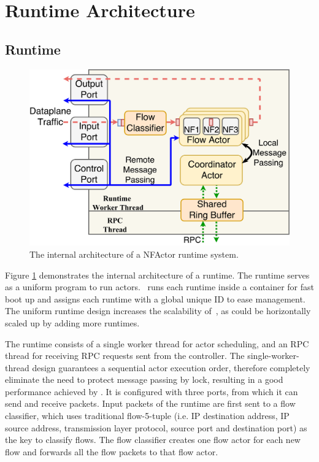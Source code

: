 \section{Runtime Architecture}

\subsection{Runtime}

\begin{figure}
		\centering
		\includegraphics[width=\columnwidth]{figure/new-nfactor-runtime-arch.pdf}

		\caption{The internal architecture of a NFActor runtime system. }
\label{fig:runtime-arch}
\end{figure}

Figure \ref{fig:runtime-arch} demonstrates the internal architecture of a runtime. The runtime serves as a uniform program to run actors. \nfactor~runs each runtime inside a container for fast boot up and assigns each runtime with a global unique ID to ease management. The uniform runtime design increases the scalability of~\nfactor, as \nfactor could be horizontally scaled up by adding more runtimes.

The runtime consists of a single worker thread for actor scheduling, and an RPC thread for receiving RPC requests sent from the controller. The single-worker-thread design guarantees a sequential actor execution order, therefore completely eliminate the need to protect message passing by lock, resulting in a good performance achieved by \nfactor. It is configured with three ports, from which it can send and receive packets. Input packets of the runtime are first sent to a flow classifier, which uses traditional flow-5-tuple (i.e. IP destination address, IP source address, transmission layer protocol, source port and destination port) as the key to classify flows. The flow classifier creates one flow actor for each new flow and forwards all the flow packets to that flow actor.

